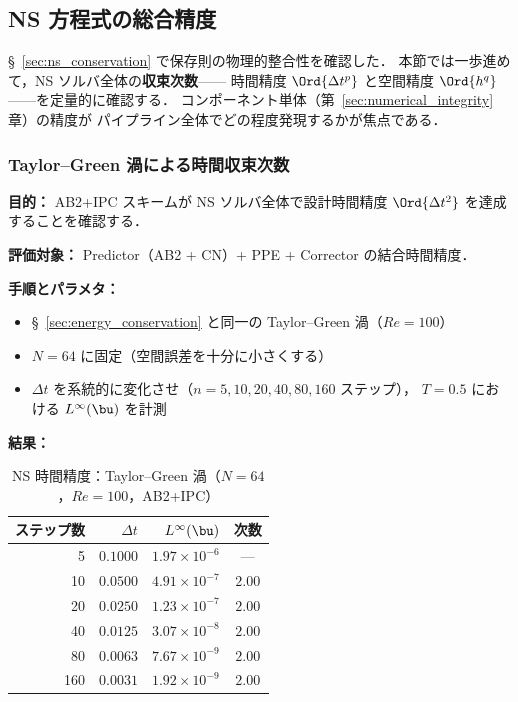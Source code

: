 %
\subsection{NS 方程式の総合精度}
\label{sec:ns_time_accuracy}

§~\ref{sec:ns_conservation} で保存則の物理的整合性を確認した．
本節では一歩進めて，NS ソルバ全体の\textbf{収束次数}——
時間精度 $\Ord{\Delta t^p}$ と空間精度 $\Ord{h^q}$ ——を定量的に確認する．
コンポーネント単体（第~\ref{sec:numerical_integrity}章）の精度が
パイプライン全体でどの程度発現するかが焦点である．

\subsubsection{Taylor--Green 渦による時間収束次数}
\label{sec:tgv_temporal}

\noindent\textbf{目的：}
AB2+IPC スキームが NS ソルバ全体で設計時間精度 $\Ord{\Delta t^2}$ を達成することを確認する．

\noindent\textbf{評価対象：}
Predictor（AB2 + CN）+ PPE + Corrector の結合時間精度．

\noindent\textbf{手順とパラメタ：}
\begin{itemize}[noitemsep]
  \item §~\ref{sec:energy_conservation} と同一の Taylor--Green 渦（$\mathit{Re}=100$）
  \item $N = 64$ に固定（空間誤差を十分に小さくする）
  \item $\Delta t$ を系統的に変化させ（$n = 5, 10, 20, 40, 80, 160$ ステップ），
        $T = 0.5$ における $L^\infty(\bu)$ を計測
\end{itemize}

\noindent\textbf{結果：}

\begin{table}[htbp]
\centering
\caption{NS 時間精度：Taylor--Green 渦（$N=64$，$\mathit{Re}=100$，AB2+IPC）}
\label{tab:tgv_temporal}
\renewcommand{\arraystretch}{1.3}
\begin{tabular}{rrrc}
\toprule
ステップ数 & $\Delta t$ & $L^\infty(\bu)$ & 次数 \\
\midrule
  5  & $0.1000$ & $1.97 \times 10^{-6}$  & --- \\
 10  & $0.0500$ & $4.91 \times 10^{-7}$ & $2.00$ \\
 20  & $0.0250$ & $1.23 \times 10^{-7}$ & $2.00$ \\
 40  & $0.0125$ & $3.07 \times 10^{-8}$ & $2.00$ \\
 80  & $0.0063$ & $7.67 \times 10^{-9}$ & $2.00$ \\
160  & $0.0031$ & $1.92 \times 10^{-9}$ & $2.00$ \\
\bottomrule
\end{tabular}
\end{table}

